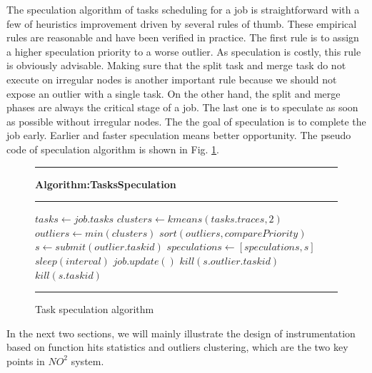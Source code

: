 The speculation algorithm of tasks scheduling for a job is straightforward with a few of
heuristics improvement driven by several rules of thumb. These empirical rules are
reasonable and have been verified in practice. The first rule is to assign a higher speculation
priority to a worse outlier. As speculation is costly, this rule is obviously advisable. Making
sure that the split task and merge task do not execute on irregular nodes is another
important rule because we should not expose an outlier with a single task. On the
other hand, the split and merge phases are always the critical stage of a job. The last
one is to speculate as soon as possible without irregular nodes. The the goal of speculation
is to complete the job early. Earlier and faster speculation means better opportunity. The
pseudo code of speculation algorithm is shown in Fig. \ref{fig-spec-algo}.

\begin{figure}
\rule[-.2pt]{0.9\columnwidth}{0.9pt}
\textbf{Algorithm:TasksSpeculation}
\rule[-.2pt]{0.9\columnwidth}{0.5pt}

\begin{algorithmic}[1]

    \State $tasks\gets job.tasks$
    \State $clusters\gets kmeans(tasks.traces, 2)$
        \State $outliers\gets min(clusters)$
        \State $sort(outliers, comparePriority)$
            \State $s\gets submit(outlier.taskid)$
            \State $speculations\gets [speculations, s]$
        \EndFor
    \EndIf
    \State $sleep(interval)$
    \State $job.update()$
            \State $kill(s.outlier.taskid)$
            \State $kill(s.taskid)$
        \EndIf
    \EndFor
\EndWhile\label{specendwhile}
\end{algorithmic}
\rule[-.2pt]{0.9\columnwidth}{0.8pt}
\caption{Task speculation algorithm}\label{fig-spec-algo}
\end{figure}

In the next two sections, we will mainly illustrate the design of instrumentation based on
function hits statistics and outliers clustering, which are the two key points in $NO^2$ system. 